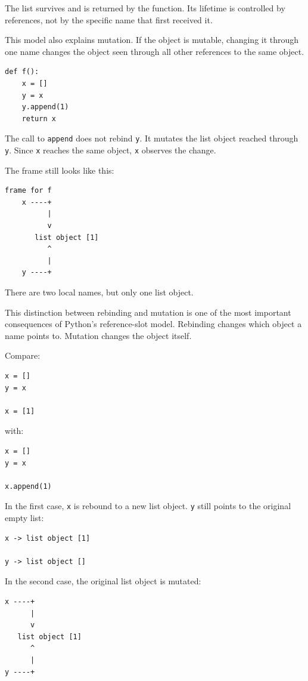 The list survives and is returned by the function. Its lifetime is controlled by references, not by the specific name that first received it.

This model also explains mutation. If the object is mutable, changing it through one name changes the object seen through all other references to the same object.

\begin{verbatim}
def f():
    x = []
    y = x
    y.append(1)
    return x
\end{verbatim}

The call to \texttt{append} does not rebind \texttt{y}. It mutates the list object reached through \texttt{y}. Since \texttt{x} reaches the same object, \texttt{x} observes the change.

The frame still looks like this:

\begin{verbatim}
frame for f
    x ----+
          |
          v
       list object [1]
          ^
          |
    y ----+
\end{verbatim}

There are two local names, but only one list object.

This distinction between rebinding and mutation is one of the most important consequences of Python's reference-slot model. Rebinding changes which object a name points to. Mutation changes the object itself.

Compare:

\begin{verbatim}
x = []
y = x

x = [1]
\end{verbatim}

with:

\begin{verbatim}
x = []
y = x

x.append(1)
\end{verbatim}

In the first case, \texttt{x} is rebound to a new list object. \texttt{y} still points to the original empty list:

\begin{verbatim}
x -> list object [1]

y -> list object []
\end{verbatim}

In the second case, the original list object is mutated:

\begin{verbatim}
x ----+
      |
      v
   list object [1]
      ^
      |
y ----+
\end{verbatim}

